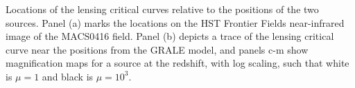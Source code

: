 \label{fig:SpockCriticalCurves}
Locations of the lensing critical curves relative to the positions of
the two \spock sources. Panel (a) marks the \spock locations on the
HST Frontier Fields near-infrared image of the MACS0416 field.
Panel (b) depicts a trace of the
lensing critical curve near the \spock positions from the GRALE
model, and panels c-m show magnification maps for a source at the \spock redshift, with log scaling, such that white is $\mu=1$ and black is $\mu=10^3$. 
